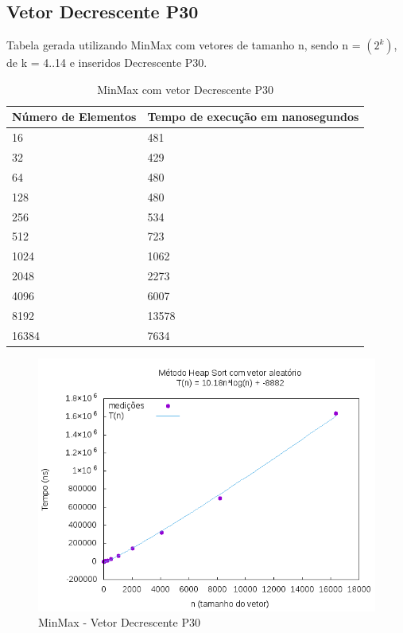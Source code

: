 \documentclass[12pt,a4paper,twoside]{report}
\begin{document}
\subsection{Vetor Decrescente P30}
Tabela gerada utilizando MinMax com vetores de tamanho n, sendo n = $(2^k)$, de k = 4..14 e inseridos Decrescente P30.
\begin{table}[H]
\centering
\caption{MinMax com vetor Decrescente P30}
\label{my-label}
\begin{tabular}{|l|l|}
\hline
\multicolumn{1}{|c|}{\textbf{Número de Elementos}} & \multicolumn{1}{c|}{\textbf{Tempo de execução em nanosegundos}} \\ \hline
16 & 481 \\ \hline
32 & 429 \\ \hline
64 & 480 \\ \hline
128 & 480 \\ \hline
256 & 534 \\ \hline
512 & 723 \\ \hline
1024 & 1062 \\ \hline
2048 & 2273 \\ \hline
4096 & 6007 \\ \hline
8192 & 13578 \\ \hline
16384 & 7634 \\ \hline
\end{tabular}
\end{table}

\begin{figure}[H]
    \centering
    \includegraphics[width=0.7\linewidth]{graficos/HeapSort/vIntAleatorio/vIntAleatorio.png}
  \caption{MinMax - Vetor Decrescente P30}
\end{figure}
\end{document}
